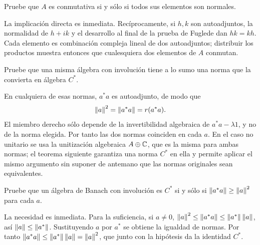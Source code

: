 \begin{ejercicio}\label{ej:v3-l25-5}
Pruebe que $A$ es conmutativa si y sólo si todos sus elementos son normales.
\end{ejercicio}
\begin{solucion}
La implicación directa es inmediata. Recíprocamente, si $h,k$ son autoadjuntos, la normalidad de $h+ik$ y el desarrollo al final de la prueba de Fuglede dan $hk=kh$. Cada elemento es combinación compleja lineal de dos autoadjuntos; distribuir los productos muestra entonces que cualesquiera dos elementos de $A$ conmutan.
\end{solucion}

\begin{ejercicio}\label{ej:v3-l25-6}
Pruebe que una misma álgebra con involución tiene a lo sumo una norma que la convierta en álgebra $C^*$.
\end{ejercicio}
\begin{solucion}
En cualquiera de esas normas, $a^*a$ es autoadjunto, de modo que
\[
 \left\lVert a\right\rVert^2=\left\lVert a^*a\right\rVert=r(a^*a).
\]
El miembro derecho sólo depende de la invertibilidad algebraica de $a^*a-\lambda1$, y no de la norma elegida. Por tanto las dos normas coinciden en cada $a$. En el caso no unitario se usa la unitización algebraica $A\oplus\mathbb C$, que es la misma para ambas normas; el teorema siguiente garantiza una norma $C^*$ en ella y permite aplicar el mismo argumento sin suponer de antemano que las normas originales sean equivalentes.
\end{solucion}

\begin{ejercicio}\label{ej:v3-l25-7}
Pruebe que un álgebra de Banach con involución es $C^*$ si y sólo si $\left\lVert a^*a\right\rVert\ge\left\lVert a\right\rVert^2$ para cada $a$.
\end{ejercicio}
\begin{solucion}
La necesidad es inmediata. Para la suficiencia, si $a\ne0$,
$\left\lVert a\right\rVert^2\le\left\lVert a^*a\right\rVert\le\left\lVert a^*\right\rVert\left\lVert a\right\rVert$, así $\left\lVert a\right\rVert\le\left\lVert a^*\right\rVert$. Sustituyendo $a$ por $a^*$ se obtiene la igualdad de normas. Por tanto $\left\lVert a^*a\right\rVert\le\left\lVert a^*\right\rVert\left\lVert a\right\rVert=\left\lVert a\right\rVert^2$, que junto con la hipótesis da la identidad $C^*$.
\end{solucion}

